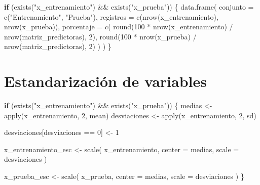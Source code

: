 \documentclass[
  11pt,
  letterpaper,
]{book}
\newenvironment{Shaded}{\begin{snugshade}}{\end{snugshade}}
\newcommand{\AttributeTok}[1]{\textcolor[rgb]{0.40,0.45,0.13}{#1}}
\newcommand{\ControlFlowTok}[1]{\textcolor[rgb]{0.00,0.23,0.31}{\textbf{#1}}}
\newcommand{\DecValTok}[1]{\textcolor[rgb]{0.68,0.00,0.00}{#1}}
\newcommand{\FunctionTok}[1]{\textcolor[rgb]{0.28,0.35,0.67}{#1}}
\newcommand{\NormalTok}[1]{\textcolor[rgb]{0.00,0.23,0.31}{#1}}
\newcommand{\OtherTok}[1]{\textcolor[rgb]{0.00,0.23,0.31}{#1}}
\newcommand{\SpecialCharTok}[1]{\textcolor[rgb]{0.37,0.37,0.37}{#1}}
\newcommand{\StringTok}[1]{\textcolor[rgb]{0.13,0.47,0.30}{#1}}
\begin{document}
\begin{Shaded}
\begin{Highlighting}[]
\ControlFlowTok{if}\NormalTok{ (}\FunctionTok{exists}\NormalTok{(}\StringTok{"x\_entrenamiento"}\NormalTok{) }\SpecialCharTok{\&\&} \FunctionTok{exists}\NormalTok{(}\StringTok{"x\_prueba"}\NormalTok{)) \{}
  \FunctionTok{data.frame}\NormalTok{(}
    \AttributeTok{conjunto =} \FunctionTok{c}\NormalTok{(}\StringTok{"Entrenamiento"}\NormalTok{, }\StringTok{"Prueba"}\NormalTok{),}
    \AttributeTok{registros =} \FunctionTok{c}\NormalTok{(}\FunctionTok{nrow}\NormalTok{(x\_entrenamiento), }\FunctionTok{nrow}\NormalTok{(x\_prueba)),}
    \AttributeTok{porcentaje =} \FunctionTok{c}\NormalTok{(}
      \FunctionTok{round}\NormalTok{(}\DecValTok{100} \SpecialCharTok{*} \FunctionTok{nrow}\NormalTok{(x\_entrenamiento) }\SpecialCharTok{/} \FunctionTok{nrow}\NormalTok{(matriz\_predictoras), }\DecValTok{2}\NormalTok{),}
      \FunctionTok{round}\NormalTok{(}\DecValTok{100} \SpecialCharTok{*} \FunctionTok{nrow}\NormalTok{(x\_prueba) }\SpecialCharTok{/} \FunctionTok{nrow}\NormalTok{(matriz\_predictoras), }\DecValTok{2}\NormalTok{)}
\NormalTok{    )}
\NormalTok{  )}
\NormalTok{\}}
\end{Highlighting}
\end{Shaded}

\section{Estandarización de
variables}\label{estandarizaciuxf3n-de-variables-1}

\begin{Shaded}
\begin{Highlighting}[]
\ControlFlowTok{if}\NormalTok{ (}\FunctionTok{exists}\NormalTok{(}\StringTok{"x\_entrenamiento"}\NormalTok{) }\SpecialCharTok{\&\&} \FunctionTok{exists}\NormalTok{(}\StringTok{"x\_prueba"}\NormalTok{)) \{}
\NormalTok{  medias }\OtherTok{\textless{}{-}} \FunctionTok{apply}\NormalTok{(x\_entrenamiento, }\DecValTok{2}\NormalTok{, mean)}
\NormalTok{  desviaciones }\OtherTok{\textless{}{-}} \FunctionTok{apply}\NormalTok{(x\_entrenamiento, }\DecValTok{2}\NormalTok{, sd)}

\NormalTok{  desviaciones[desviaciones }\SpecialCharTok{==} \DecValTok{0}\NormalTok{] }\OtherTok{\textless{}{-}} \DecValTok{1}

\NormalTok{  x\_entrenamiento\_esc }\OtherTok{\textless{}{-}} \FunctionTok{scale}\NormalTok{(}
\NormalTok{    x\_entrenamiento,}
    \AttributeTok{center =}\NormalTok{ medias,}
    \AttributeTok{scale =}\NormalTok{ desviaciones}
\NormalTok{  )}

\NormalTok{  x\_prueba\_esc }\OtherTok{\textless{}{-}} \FunctionTok{scale}\NormalTok{(}
\NormalTok{    x\_prueba,}
    \AttributeTok{center =}\NormalTok{ medias,}
    \AttributeTok{scale =}\NormalTok{ desviaciones}
\NormalTok{  )}
\NormalTok{\}}
\end{Highlighting}
\end{Shaded}
\end{document}
